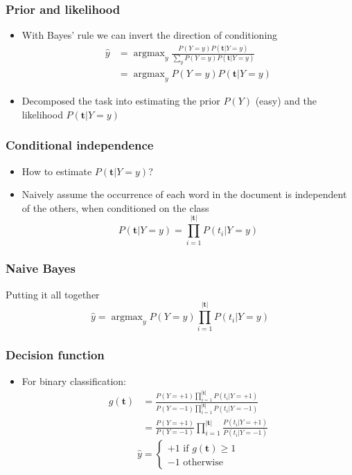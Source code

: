\documentclass[14pt,mathserif]{beamer}
\DeclareMathOperator*{\argmax}{argmax}
\begin{document}
\begin{frame}
  \frametitle{Prior and likelihood}
  \begin{itemize}
  \item With Bayes' rule we can invert the direction of conditioning
\begin{align}\nonumber
\hat{y} & = \argmax_y \frac{P(Y=y)P(\mathbf{t}|Y=y)}{\sum_y P(Y=y)P(\mathbf{t}|Y=y) }\\\nonumber
        & = \argmax_y P(Y=y)P(\mathbf{t}|Y=y)
\end{align}
\item Decomposed the task into estimating the prior $P(Y)$ (easy) and
  the likelihood $P(\mathbf{t}|Y=y)$
  \end{itemize}
\end{frame}


\begin{frame}
  \frametitle{Conditional independence}
  \begin{itemize}
  \item How to estimate $P(\mathbf{t}|Y=y)$?
  \item \alert{Naively} assume the occurrence of each word in the
    document is independent of the others, when conditioned on the
    class
    \[
    P(\mathbf{t}|Y=y) = \prod_{i=1}^{|\mathbf{t}|} P(t_i|Y=y)
    \]
  \end{itemize}
\end{frame}



\begin{frame}\frametitle{Naive Bayes}
  \begin{block}{Putting it all together}
    \[
   \hat{y} = \argmax_y P(Y=y)\prod_{i=1}^{|\mathbf{t}|} P(t_i|Y=y)
    \]
\end{block}
\end{frame}


\begin{frame}\frametitle{Decision function}
\begin{itemize}
  \item For binary classification:
    \begin{align}\nonumber
    g(\mathbf{t}) & = \frac{P(Y=+1)\prod_{i=1}^{|\mathbf{t}|} P(t_i|Y=+1)}
                {P(Y=-1)\prod_{i=1}^{|\mathbf{t}|} P(t_i|Y=-1)}\\\nonumber
         & = \frac{P(Y=+1)}{P(Y=-1)}\prod_{i=1}^{|\mathbf{t}|} \frac{P(t_i|Y=+1)}{P(t_i|Y=-1)}
    \end{align}
    \[
    \hat{y} = 
    \begin{cases}
      +1 \text{ if } g(\mathbf{t}) \geq 1\\
      -1 \text{ otherwise }
    \end{cases}
    \]
  \end{itemize}
\end{frame}
\end{document}
